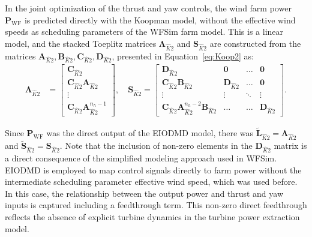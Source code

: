In the joint optimization of the thrust and yaw controls, the wind farm power $\bm{P}_{\text{WF}}$ is predicted directly with the Koopman model, without the effective wind speeds as scheduling parameters of the WFSim farm model. This is a linear model, and the stacked Toeplitz matrices $\bm{\Lambda}_{\hat{K}2}$ and $\bm{S}_{\hat{K}2}$ are constructed from the matrices $\bm{A}_{\hat{K}2}, \bm{B}_{\hat{K}2}, \bm{C}_{\hat{K}2}, \bm{D}_{\hat{K}2}$, presented in Equation~\eqref{eq:Koop2} as:
\begin{align*}
    \bm{\Lambda}_{\hat{K}2} &= \begin{bmatrix}
        \bm{C}_{\hat{K}2} \\
        \bm{C}_{\hat{K}2} \bm{A}_{\hat{K}2} \\
        \vdots \\
        \bm{C}_{\hat{K}2} \bm{A}_{\hat{K}2}^{n_h-1}
    \end{bmatrix}, \quad
    \bm{S}_{\hat{K}2} =
    \begin{bmatrix}
        \bm{D}_{\hat{K}2} & \bm{0} & \dots & \bm{0}\\
        \bm{C}_{\hat{K}2} \bm{B}_{\hat{K}2} & \bm{D}_{\hat{K}2} & \dots & \bm{0}\\
        \vdots & \vdots & \ddots & \vdots \\
        \bm{C}_{\hat{K}2} \bm{A}_{\hat{K}2}^{n_h-2} \bm{B}_{\hat{K}2} & \dots & \dots & \bm{D}_{\hat{K}2}
    \end{bmatrix}.
\end{align*}


Since $\bm{P}_{\text{WF}}$ was the direct output of the EIODMD model, there was $\tilde{\bm{L}}_{\hat{K}2} = \bm{\Lambda}_{\hat{K}2}$ and $\tilde{\bm{S}}_{\hat{K}2} = \bm{S}_{\hat{K}2}$. Note that the inclusion of non-zero elements in the $\bm{D}_{\hat{K}2}$ matrix is a direct consequence of the simplified modeling approach used in WFSim. EIODMD is employed to map control signals directly to farm power without the intermediate scheduling parameter effective wind speed, which was used before. In this case, the relationship between the output power and thrust and yaw inputs is captured including a feedthrough term. This non-zero direct feedthrough reflects the absence of explicit turbine dynamics in the turbine power extraction model.

